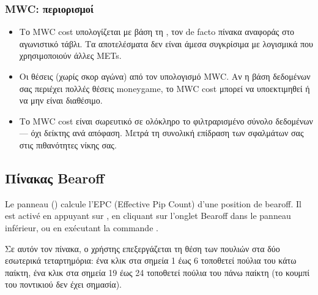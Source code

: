 \documentclass[letterpaper,10pt,greek]{sphinxmanual}
\begin{document}
\subsubsection{MWC: περιορισμοί}
\label{\detokenize{manuel:mwc-limitations}}\begin{itemize}
\item {} 
\sphinxAtStartPar
Το MWC cost υπολογίζεται με βάση τη , τον de facto πίνακα αναφοράς στο αγωνιστικό τάβλι. Τα αποτελέσματα δεν είναι άμεσα συγκρίσιμα με λογισμικά που χρησιμοποιούν άλλες METs.

\item {} 
\sphinxAtStartPar
Οι θέσεις  (χωρίς σκορ αγώνα)  από τον υπολογισμό MWC. Αν η βάση δεδομένων σας περιέχει πολλές θέσεις money\sphinxhyphen{}game, το MWC cost μπορεί να υποεκτιμηθεί ή να μην είναι διαθέσιμο.

\item {} 
\sphinxAtStartPar
Το MWC cost είναι σωρευτικό σε ολόκληρο το φιλτραρισμένο σύνολο δεδομένων — όχι δείκτης ανά απόφαση. Μετρά τη συνολική επίδραση των σφαλμάτων σας στις πιθανότητες νίκης σας.

\end{itemize}


\subsection{Πίνακας Bearoff}
\label{\detokenize{manuel:panneau-bearoff}}\label{\detokenize{manuel:panneau-epc}}
\sphinxAtStartPar
Le panneau  () calcule l’EPC (Effective Pip Count) d’une
position de bearoff. Il est activé en appuyant sur , en cliquant sur
l’onglet Bearoff dans le panneau inférieur, ou en exécutant la commande
.

\sphinxAtStartPar
Σε αυτόν τον πίνακα, ο χρήστης επεξεργάζεται τη θέση των πουλιών στα δύο εσωτερικά τεταρτημόρια: ένα κλικ στα σημεία 1 έως 6 τοποθετεί πούλια του κάτω παίκτη, ένα κλικ στα σημεία 19 έως 24 τοποθετεί πούλια του πάνω παίκτη (το κουμπί του ποντικιού δεν έχει σημασία).
\end{document}
